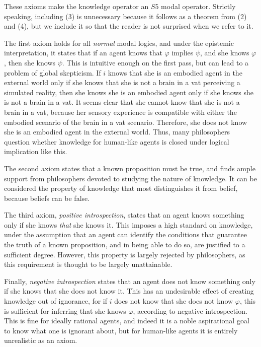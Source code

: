 These axioms make the knowledge operator an $\mathit{S5}$ modal operator. Strictly speaking, including (3) is unnecessary because it follows as a theorem from (2) and (4), but we include it so that the reader is not surprised when we refer to it.

The first axiom holds for all \emph{normal} modal logics, and under the epistemic interpretation, it states that if an agent knows that $\varphi$ implies $\psi$, and she knows $\varphi$, then she knows $\psi$. This is intuitive enough on the first pass, but can lead to a problem of global skepticism. If $i$ knows that she is an embodied agent in the external world only if she knows that she is not a brain in a vat perceiving a simulated reality, then she knows she is an embodied agent only if she knows she is not a brain in a vat. It seems clear that she cannot know that she is not a brain in a vat, because her sensory experience is compatible with either the embodied scenario of the brain in a vat scenario. Therefore, she does not know she is an embodied agent in the external world. Thus, many philosophers question whether knowledge for human-like agents is closed under logical implication like this.

The second axiom states that a known proposition must be true, and finds ample support from philosophers devoted to studying the nature of knowledge. It can be considered the property of knowledge that most distinguishes it from belief, because beliefs can be false.

The third axiom, \emph{positive introspection}, states that an agent knows something only if she knows \emph{that} she knows it. This imposes a high standard on knowledge, under the assumption that an agent can identify the conditions that guarantee the truth of a known proposition, and in being able to do so, are justified to a sufficient degree. However, this property is largely rejected by philosophers, as this requirement is thought to be largely unattainable. 

Finally, \emph{negative introspection} states that an agent does not know something only if she knows that she does not know it. This has an undesirable effect of creating knowledge out of ignorance, for if $i$ does not know that she does not know $\varphi$, this is sufficient for inferring that she knows $\varphi$, according to negative introspection. This is fine for ideally rational agents, and indeed it is a noble aspirational goal to know what one is ignorant about, but for human-like agents it is entirely unrealistic as an axiom.

